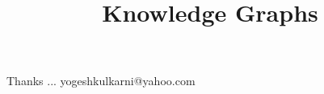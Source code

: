 \documentclass[xcolor=dvipsnames,compress,t,pdf,9pt]{beamer}
\title[\insertframenumber /\inserttotalframenumber]{Knowledge Graphs}
\begin{document}
	\begin{frame}
	\titlepage
%
	\end{frame}
	
	
	\begin{frame}[c]{}
	Thanks ...
	\vspace{5mm}
	yogeshkulkarni@yahoo.com
	\end{frame}
\end{document}
